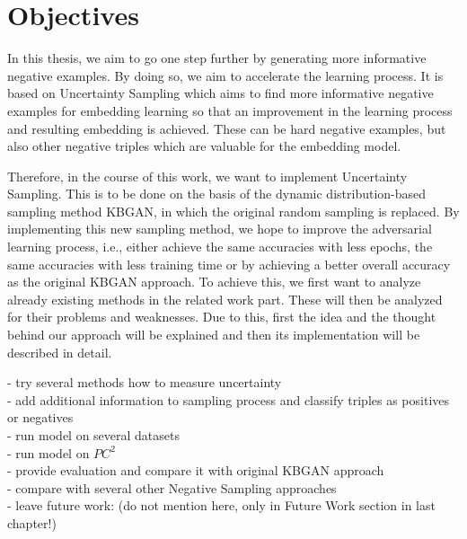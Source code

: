 \section{Objectives}
\label{sec:objectives}

In this thesis, we aim to go one step further by generating more informative negative examples. 
By doing so, we aim to accelerate the learning process.
It is based on Uncertainty Sampling which aims to find more informative negative examples for embedding learning so that an improvement in the learning process and resulting embedding is achieved.
These can be hard negative examples, but also other negative triples which are valuable for the embedding model.

Therefore, in the course of this work, we want to implement Uncertainty Sampling.
This is to be done on the basis of the dynamic distribution-based sampling method KBGAN, in which the original random sampling is replaced.
By implementing this new sampling method, we hope to improve the adversarial learning process, i.e., either achieve the same accuracies with less epochs, the same accuracies with less training time or by achieving a better overall accuracy as the original KBGAN approach.
To achieve this, we first want to analyze already existing methods in the related work part.
These will then be analyzed for their problems and weaknesses.
Due to this, first the idea and the thought behind our approach will be explained and then its implementation will be described in detail.

- try several methods how to measure uncertainty\\
- add additional information to sampling process and classify triples as positives or negatives\\
- run model on several datasets\\
- run model on $PC^2$\\
- provide evaluation and compare it with original KBGAN approach\\
- compare with several other Negative Sampling approaches\\
- leave future work: (do not mention here, only in Future Work section in last chapter!)\\
